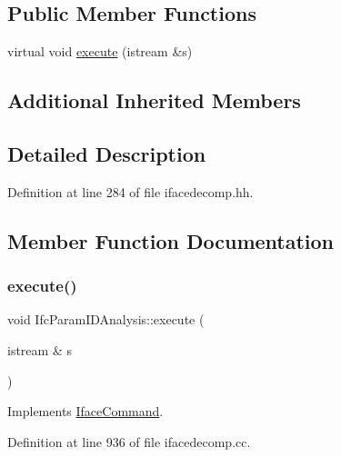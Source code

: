 \subsection*{Public Member Functions}
\begin{DoxyCompactItemize}
\item 
virtual void \mbox{\hyperlink{class_ifc_param_i_d_analysis_a2d04839fdf4e27a6dc1e5240ee3f8555}{execute}} (istream \&s)
\end{DoxyCompactItemize}
\subsection*{Additional Inherited Members}


\subsection{Detailed Description}


Definition at line 284 of file ifacedecomp.\+hh.



\subsection{Member Function Documentation}
\mbox{\label{class_ifc_param_i_d_analysis_a2d04839fdf4e27a6dc1e5240ee3f8555}} 
\subsubsection{\texorpdfstring{execute()}{execute()}}
{\footnotesize\ttfamily void Ifc\+Param\+I\+D\+Analysis\+::execute (\begin{DoxyParamCaption}\item[{istream \&}]{s }\end{DoxyParamCaption})\hspace{0.3cm}{\ttfamily [virtual]}}



Implements \mbox{\hyperlink{class_iface_command_af10e29cee2c8e419de6efe9e680ad201}{Iface\+Command}}.



Definition at line 936 of file ifacedecomp.\+cc.

